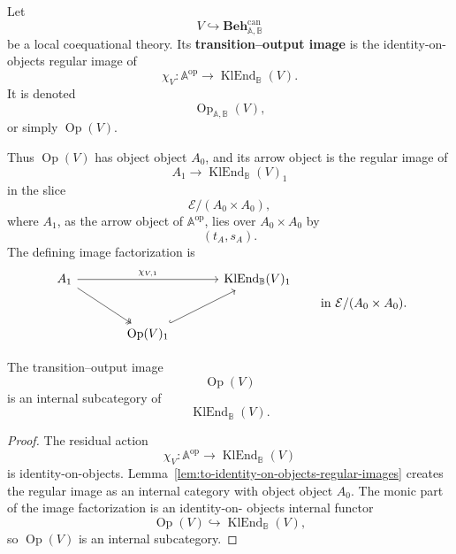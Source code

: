 \begin{definition}
\label{def:to-operation-image}
    Let
    \[
        V\hookrightarrow
        \mathbf{Beh}^{\mathrm{can}}_{\mathbb A,\mathbb B}
    \]
    be a local coequational theory. Its \textbf{transition--output image} is
    the identity-on-objects regular image of
    \[
        \chi_V:
        \mathbb A^{\mathrm{op}}
        \to
        \operatorname{KlEnd}_{\mathbb B}(V).
    \]
    It is denoted
    \[
        \operatorname{Op}_{\mathbb A,\mathbb B}(V),
    \]
    or simply \(\operatorname{Op}(V)\).
\end{definition}

Thus \(\operatorname{Op}(V)\) has object object \(A_0\), and its arrow object
is the regular image of
\[
    A_1\to \operatorname{KlEnd}_{\mathbb B}(V)_1
\]
in the slice
\[
    \mathcal E/(A_0\times A_0),
\]
where \(A_1\), as the arrow object of \(\mathbb A^{\mathrm{op}}\), lies over
\(A_0\times A_0\) by
\[
    (t_A,s_A).
\]
The defining image factorization is
\[
\begin{tikzcd}[column sep=large, row sep=large]
    A_1
        \arrow[rr, "\chi_{V,1}"]
        \arrow[dr, two heads]
    &&
    \operatorname{KlEnd}_{\mathbb B}(V)_1
    \\
    &
    \operatorname{Op}(V)_1
        \arrow[ur, hook]
    &
\end{tikzcd}
\qquad
\text{in }\mathcal E/(A_0\times A_0).
\]

\begin{proposition}
\label{prop:to-operation-image-subcategory}
    The transition--output image
    \[
        \operatorname{Op}(V)
    \]
    is an internal subcategory of
    \[
        \operatorname{KlEnd}_{\mathbb B}(V).
    \]
\end{proposition}

\begin{proof}
    The residual action
    \[
        \chi_V:
        \mathbb A^{\mathrm{op}}
        \to
        \operatorname{KlEnd}_{\mathbb B}(V)
    \]
    is identity-on-objects. Lemma~\ref{lem:to-identity-on-objects-regular-images}
    creates the regular image as an internal category with object object
    \(A_0\). The monic part of the image factorization is an identity-on-
    objects internal functor
    \[
        \operatorname{Op}(V)\hookrightarrow
        \operatorname{KlEnd}_{\mathbb B}(V),
    \]
    so \(\operatorname{Op}(V)\) is an internal subcategory.
\end{proof}

